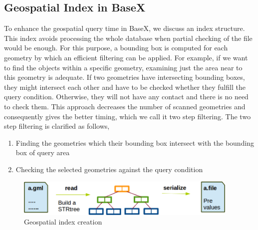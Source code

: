 \documentclass[a4paper,12pt]{article}
\begin{document}
\subsection{Geospatial Index in BaseX}
\label{indexBX}
To enhance the geospatial query time in BaseX, we discuss an index structure. This index avoids processing the whole database when partial checking of the file would be enough. For this purpose, a bounding box is computed for each geometry by which an efficient filtering can be applied. For example, if we want to find the objects within a specific geometry, examining just the area near to this geometry is adequate. If two geometries have intersecting bounding boxes, they might intersect each other and have to be checked whether they fulfill the query condition. Otherwise, they will not have any contact and there is no need to check them. This approach decreases the number of scanned geometries and consequently gives the better timing, which we call it two step filtering. The two step filtering is clarified as follows,
\begin{enumerate}
\item Finding the geometries which their bounding box intersect with the bounding box of query area
\item Checking the selected geometries against the query condition
\end{enumerate}


 \begin{figure}
\centering
\includegraphics[width=0.95\textwidth]{IndexinFile}
\caption{Geospatial index creation}
\label{figIndexinFile}
\end{figure}
\end{document}
